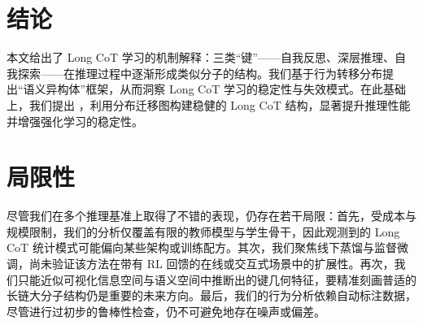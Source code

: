 \section{结论}
本文给出了 Long CoT 学习的机制解释：三类“键”——自我反思、深层推理、自我探索——在推理过程中逐渐形成类似分子的结构。我们基于行为转移分布提出“语义异构体”框架，从而洞察 Long CoT 学习的稳定性与失效模式。在此基础上，我们提出 \method，利用分布迁移图构建稳健的 Long CoT 结构，显著提升推理性能并增强强化学习的稳定性。

\newpage
\section*{局限性}
尽管我们在多个推理基准上取得了不错的表现，仍存在若干局限：首先，受成本与规模限制，我们的分析仅覆盖有限的教师模型与学生骨干，因此观测到的 Long CoT 统计模式可能偏向某些架构或训练配方。其次，我们聚焦线下蒸馏与监督微调，尚未验证该方法在带有 RL 回馈的在线或交互式场景中的扩展性。再次，我们只能近似可视化信息空间与语义空间中推断出的键几何特征，要精准刻画普适的长链大分子结构仍是重要的未来方向。最后，我们的行为分析依赖自动标注数据，尽管进行过初步的鲁棒性检查，仍不可避免地存在噪声或偏差。
